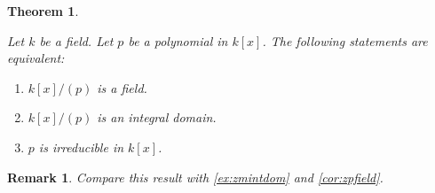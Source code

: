 \documentclass[a4paper,12pt]{report}
\newcounter{statement}
\numberwithin{statement}{chapter}
\newtheorem{thm}[statement]{Theorem}
\newtheorem*{remark}{\bf Remark}
\numberwithin{equation}{chapter}
\numberwithin{section}{chapter}
\numberwithin{subsection}{section}
\begin{document}
\begin{thm}
\label{thm:pirredfield}


Let $k$ be a field.  Let $p$ be a polynomial in $k[x]$.
The following statements are equivalent:
\begin{enumerate}
\item 
$k[x]/(p)$ is a field.

\item 
$k[x]/(p)$ is an integral domain.

\item 
$p$ is irreducible in $k[x]$.
\end{enumerate}
\end{thm}
\begin{remark}

Compare this result with \cref{ex:zmintdom} and \cref{cor:zpfield}.
\end{remark}
\end{document}
